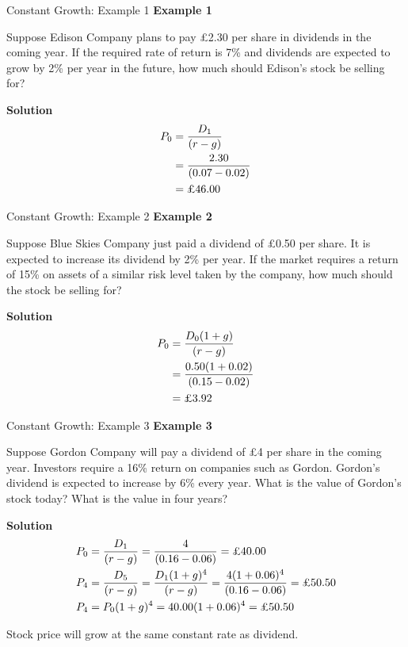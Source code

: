 \documentclass[9pt,aspectratio=169]{beamer}
\begin{document}
\begin{frame}{Constant Growth: Example 1}
\textbf{Example 1}

Suppose Edison Company plans to pay £2.30 per share in dividends in the coming year. If the required rate of return is 7\% and dividends are expected to grow by 2\% per year in the future, how much should Edison's stock be selling for?

\vspace{1cm}
\textbf{Solution}
\begin{align}\nonumber
P_0 &= \frac{D_1}{(r - g)} \\\nonumber
&= \frac{2.30}{(0.07 - 0.02)} \\\nonumber
&= \text{\pounds}\LEdisonPrice
\end{align}


\end{frame}

\begin{frame}{Constant Growth: Example 2}
\textbf{Example 2}

Suppose Blue Skies Company just paid a dividend of £0.50 per share. It is expected to increase its dividend by 2\% per year. If the market requires a return of 15\% on assets of a similar risk level taken by the company, how much should the stock be selling for?

\vspace{1cm}
\textbf{Solution}
\begin{align}\nonumber
P_0 &= \frac{D_0(1 + g)}{(r - g)} \\\nonumber
&= \frac{0.50(1 + 0.02)}{(0.15 - 0.02)} \\\nonumber
&= \text{\pounds}\LBlueSkiesPrice
\end{align}


\end{frame}

\begin{frame}{Constant Growth: Example 3}
\textbf{Example 3}

Suppose Gordon Company will pay a dividend of £4 per share in the coming year. Investors require a 16\% return on companies such as Gordon. Gordon's dividend is expected to increase by 6\% every year. What is the value of Gordon's stock today? What is the value in four years?

\vspace{0.5cm}
\textbf{Solution}
\begin{align}\nonumber
P_0 &= \frac{D_1}{(r - g)} = \frac{4}{(0.16 - 0.06)} = \text{\pounds}\LGordonPrice \\\nonumber
P_4 &= \frac{D_5}{(r-g)} = \frac{D_1(1+g)^4}{(r-g)} = \frac{4(1+0.06)^4}{(0.16-0.06)} = \text{\pounds}\LGordonPriceFour \\\nonumber
P_4 &= P_0(1 + g)^4 = \LGordonPrice(1 + 0.06)^4 = \text{\pounds}\LGordonPriceFour
\end{align}

Stock price will grow at the same constant rate as dividend.

\end{frame}
\end{document}
